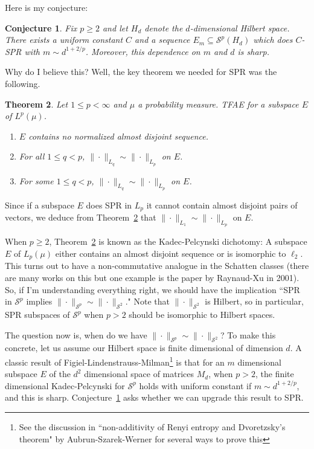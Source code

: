 \documentclass[12pt,leqno]{amsart}
\numberwithin{equation}{section}
\theoremstyle{plain}
\newtheorem{theorem}{Theorem}[section]
\newtheorem{conjecture}[theorem]{Conjecture}
\theoremstyle{definition}
\begin{document}
Here is my conjecture: 
\begin{conjecture}\label{conj}
    Fix  $p\geq 2$ and let $H_d$ denote the $d$-dimensional Hilbert space. There exists a uniform constant $C$ and a sequence $E_m \subseteq \mathcal{S}^p(H_d)$ which does $C$-SPR with $m\sim d^{1+2/p}$. Moreover, this dependence on $m$ and $d$  is sharp.
\end{conjecture}
Why do I believe this? Well, the key  theorem we needed for SPR was the following.
\begin{theorem}\label{them1}
    Let $1\leq p<\infty$ and $\mu$ a probability measure. TFAE for a subspace $E$ of $L^p(\mu)$.
    \begin{enumerate}
        \item $E$ contains no normalized almost disjoint sequence.
        \item For all $1\leq q<p$, $\|\cdot\|_{L_q}\sim \|\cdot\|_{L_p}$ on $E$.
         \item For some $1\leq q<p$, $\|\cdot\|_{L_q}\sim \|\cdot\|_{L_p}$ on $E$.
    \end{enumerate}
\end{theorem}
Since if a subspace $E$ does SPR in $L_p$ it cannot contain almost disjoint pairs of vectors, we deduce from Theorem~\ref{them1} that $\|\cdot\|_{L_1}\sim \|\cdot\|_{L_p}$ on $E$. 
\medskip

When $p\geq 2$, Theorem~\ref{them1} is known as the Kadec-Pelcynski dichotomy: A subspace $E$ of $L_p(\mu)$ either contains an almost disjoint sequence or is isomorphic to $\ell_2$.  This turns out to have a non-commutative analogue in the Schatten classes (there are many works on this but one example is the paper by Raynaud-Xu in 2001). So, if I'm understanding everything right, we should have the implication ``SPR in $\mathcal{S}^p$ implies $\|\cdot\|_{\mathcal{S}^p}\sim \|\cdot\|_{\mathcal{S}^2}$." Note that $\|\cdot\|_{\mathcal{S}^2}$ is Hilbert, so in particular, SPR subspaces of $\mathcal{S}^p$ when $p>2$ should be isomorphic to Hilbert spaces.
\medskip


The question now is, when do we have $\|\cdot\|_{\mathcal{S}^p}\sim \|\cdot\|_{\mathcal{S}^2}$? To make this concrete, let us  assume our Hilbert space is finite dimensional of dimension $d$. A classic result of Figiel-Lindenstrauss-Milman\footnote{See the discussion in ``non-additivity of Renyi entropy and Dvoretzsky's theorem" by Aubrun-Szarek-Werner for several ways to prove this} is that for an $m$ dimensional subspace $E$ of the $d^2$ dimensional space of matrices $M_d$, when $p>2$, the finite dimensional Kadec-Pelcynski for $\mathcal{S}^p$ holds with uniform constant if $m\sim d^{1+2/p}$, and this is sharp. 
Conjecture~\ref{conj} asks whether we can upgrade this result to SPR.
\medskip
\end{document}
